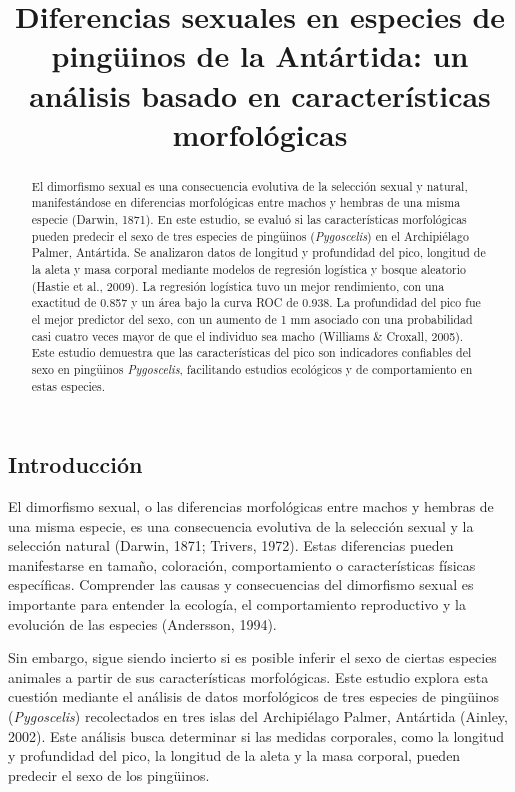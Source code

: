 \documentclass[
]{agujournal2019}
\begin{document}
\title{Diferencias sexuales en especies de pingüinos de la Antártida: un
análisis basado en características morfológicas}



\begin{abstract}
El dimorfismo sexual es una consecuencia evolutiva de la selección
sexual y natural, manifestándose en diferencias morfológicas entre
machos y hembras de una misma especie (Darwin, 1871). En este estudio,
se evaluó si las características morfológicas pueden predecir el sexo de
tres especies de pingüinos (\emph{Pygoscelis}) en el Archipiélago
Palmer, Antártida. Se analizaron datos de longitud y profundidad del
pico, longitud de la aleta y masa corporal mediante modelos de regresión
logística y bosque aleatorio (Hastie et al., 2009). La regresión
logística tuvo un mejor rendimiento, con una exactitud de 0.857 y un
área bajo la curva ROC de 0.938. La profundidad del pico fue el mejor
predictor del sexo, con un aumento de 1 mm asociado con una probabilidad
casi cuatro veces mayor de que el individuo sea macho (Williams \&
Croxall, 2005). Este estudio demuestra que las características del pico
son indicadores confiables del sexo en pingüinos \emph{Pygoscelis},
facilitando estudios ecológicos y de comportamiento en estas especies.
\end{abstract}





\subsection{Introducción}\label{introducciuxf3n}

El dimorfismo sexual, o las diferencias morfológicas entre machos y
hembras de una misma especie, es una consecuencia evolutiva de la
selección sexual y la selección natural (Darwin, 1871; Trivers, 1972).
Estas diferencias pueden manifestarse en tamaño, coloración,
comportamiento o características físicas específicas. Comprender las
causas y consecuencias del dimorfismo sexual es importante para entender
la ecología, el comportamiento reproductivo y la evolución de las
especies (Andersson, 1994).

Sin embargo, sigue siendo incierto si es posible inferir el sexo de
ciertas especies animales a partir de sus características morfológicas.
Este estudio explora esta cuestión mediante el análisis de datos
morfológicos de tres especies de pingüinos (\emph{Pygoscelis})
recolectados en tres islas del Archipiélago Palmer, Antártida (Ainley,
2002). Este análisis busca determinar si las medidas corporales, como la
longitud y profundidad del pico, la longitud de la aleta y la masa
corporal, pueden predecir el sexo de los pingüinos.
\end{document}
